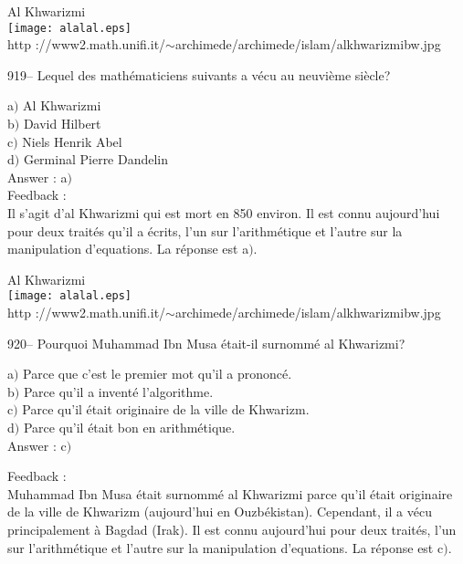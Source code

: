 \documentclass[letterpaper, 12pt]{article}
\begin{document}
        \begin{center}
        Al Khwarizmi\\
    \texttt{[image: alalal.eps]}\\
        {\footnotesize http
://www2.math.unifi.it/$\sim$archimede/archimede/islam/alkhwarizmibw.jpg}
    \end{center}

919-- Lequel des math\'ematiciens suivants a v\'ecu au neuvi\`eme
si\`ecle?

a$)$ Al Khwarizmi \\
b$)$ David Hilbert \\
c$)$ Niels Henrik Abel \\
d$)$ Germinal Pierre Dandelin\\

Answer : a$)$\\

Feedback :  \\
Il s'agit d'al Khwarizmi qui est mort en 850 environ. Il est connu
aujourd'hui pour deux trait\'es qu'il a \'ecrits,
l'un sur l'arithm\'etique et l'autre sur la manipulation d'equations. La
r\'eponse est a$)$.\\

        \begin{center}
        Al Khwarizmi\\
    \texttt{[image: alalal.eps]}\\
        {\footnotesize http
://www2.math.unifi.it/$\sim$archimede/archimede/islam/alkhwarizmibw.jpg}
    \end{center}

920-- Pourquoi Muhammad Ibn Musa \'etait-il surnomm\'e al Khwarizmi?

a$)$ Parce que c'est le premier mot qu'il a prononc\'e. \\
b$)$ Parce qu'il a invent\'e l'algorithme. \\
c$)$ Parce qu'il \'etait originaire de la ville de Khwarizm. \\
d$)$ Parce qu'il \'etait bon en arithm\'etique.  \\

Answer : c$)$\

Feedback : \\
Muhammad Ibn Musa \'etait surnomm\'e al Khwarizmi parce qu'il
\'etait originaire de la ville de Khwarizm (aujourd'hui en
Ouzb\'ekistan). Cependant, il a v\'ecu principalement \`a Bagdad
(Irak). Il est connu aujourd'hui pour deux trait\'es,
l'un sur l'arithm\'etique et l'autre sur la manipulation d'equations. La
r\'eponse est c$)$.\\
\end{document}
